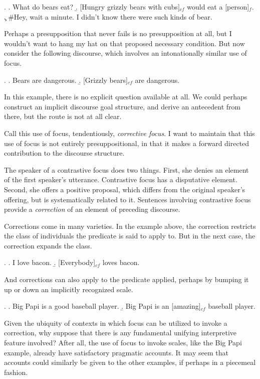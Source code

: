 \documentclass[letterpaper,10pt]{article}
\begin{document}
\ex. \a. What do bears eat?
\b. [Hungry grizzly bears with cubs]$_{cf}$ would eat a [person]$_f$.
\c. \#Hey, wait a minute. I didn't know there were such kinds of bear.

Perhaps a presupposition that never fails is no presupposition at all, but I wouldn't want to hang my hat on that proposed necessary condition.  But now consider the following discourse, which involves an intonationally similar use of focus.

\ex. \a. Bears are dangerous.
\b. [Grizzly bears]$_{cf}$ are dangerous.

In this example, there is no explicit question available at all. We could perhaps construct an implicit discourse goal structure, and derive an antecedent from there, but the route is not at all clear.

Call this use of focus, tendentiously, \textit{corrective focus}.  I want to maintain that this use of focus is not entirely presuppositional, in that it makes a forward directed contribution to the discourse structure.

The speaker of a contrastive focus does two things.  First, she denies an element of the first speaker's utterance.  Contrastive focus has a disputative element.  Second, she offers a positive proposal, which differs from the original speaker's offering, but is systematically related to it.  Sentences involving contrastive focus provide a \textit{correction} of an element of preceding discourse.

Corrections come in many varieties.  In the example above, the correction restricts the class of individuals the predicate is said to apply to.  But in the next case, the correction expands the class.

\ex. \a. I love bacon.
\b. [Everybody]$_{cf}$ loves bacon.

And corrections can also apply to the predicate applied, perhaps by bumping it up or down an implicitly recognized scale.

\ex. \a. Big Papi is a good baseball player.
\b. Big Papi is an [amazing]$_{cf}$ baseball player.

Given the ubiquity of contexts in which focus can be utilized to invoke a correction, why suppose that there is any fundamental unifying interpretive feature involved?  After all, the use of focus to invoke scales, like the Big Papi example, already have satisfactory pragmatic accounts.  It may seem that accounts could similarly be given to the other examples, if perhaps in a piecemeal fashion.
\end{document}
